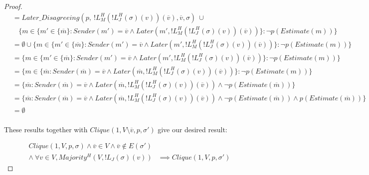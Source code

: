 \begin{proof}
\begin{align}
&= Later\_Disagreeing(p,~!L^H_M(!L^H_J(\sigma)(v))(\overline{v}), \overline{v}, \sigma) ~ \cup\\
&~~~~\{m \in \{m' \in \{\overline{m}\} : Sender(m') = \overline{v} \land Later(m', !L^H_M(!L^H_J(\sigma)(v))(\overline{v}))\} : \neg p(Estimate(m)) \} \\
&= \emptyset \cup \{m \in \{m' \in \{\overline{m}\} : Sender(m') = \overline{v} \land Later(m', !L^H_M(!L^H_J(\sigma)(v))(\overline{v}))\} : \neg p(Estimate(m)) \} \\
&= \{m \in \{m' \in \{\overline{m}\} : Sender(m') = \overline{v} \land Later(m', !L^H_M(!L^H_J(\sigma)(v))(\overline{v}))\} : \neg p(Estimate(m)) \} \\
&= \{m \in \{\overline{m} : Sender(\overline{m}) = \overline{v} \land Later(\overline{m}, !L^H_M(!L^H_J(\sigma)(v))(\overline{v}))\} : \neg p(Estimate(m)) \} \\
&= \{\overline{m} : Sender(\overline{m}) = \overline{v} \land Later(\overline{m}, !L^H_M(!L^H_J(\sigma)(v))(\overline{v})) \land \neg p(Estimate(\overline{m})) \} \\
&= \{\overline{m} : Sender(\overline{m}) = \overline{v} \land Later(\overline{m}, !L^H_M(!L^H_J(\sigma)(v))(\overline{v})) \land \neg p(Estimate(\overline{m})) \land p(Estimate(\overline{m}))\} \\
&= \emptyset \\
\end{align}

These results together with $Clique(1, V \setminus {\overline{v}}, p, \sigma')$ give our desired result:

\begin{align}
Clique(1, V, p, \sigma) \land \overline{v} \in V \land \overline{v} \notin E(\sigma') &\\
\land ~\forall v \in V, Majority^H(V, !L_J(\sigma)(v)) &\implies Clique(1, V, p, \sigma')
\end{align}

\end{proof}






